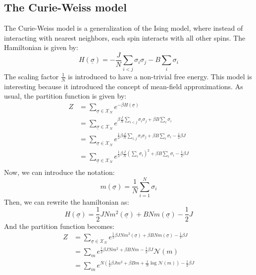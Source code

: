 \subsection{The Curie-Weiss model}
\label{sec:curie_weiss}
The Curie-Weiss model is a generalization of the Ising model, where instead of interacting with nearest neighbors, each spin interacts with all other spins. The Hamiltonian is given by:
\begin{equation}
    H(\underline{\sigma}) = -\frac{J}{N}\sum_{i<j}\sigma_i\sigma_j - B\sum_i \sigma_i
\end{equation}
The scaling factor $\frac{1}{N}$ is introduced to have a non-trivial free energy. This model is interesting because it introduced the concept of mean-field approximations. As usual, the partition function is given by:
\begin{equation}
    \begin{aligned}
        Z &= \sum_{\underline{\sigma}\in\mathcal{X}_N}e^{-\beta H(\underline{\sigma})}\\
        &= \sum_{\underline{\sigma}\in\mathcal{X}_N}e^{\beta\frac{J}{N}\sum_{i<j}\sigma_i\sigma_j+\beta B \sum_i \sigma_i}\\
        &= \sum_{\underline{\sigma}\in\mathcal{X}_N}e^{\frac{1}{2}\beta\frac{J}{N}\sum_{i,j}\sigma_i\sigma_j+\beta B \sum_i \sigma_i-\frac{1}{2}\beta J}\\
        &= \sum_{\underline{\sigma}\in\mathcal{X}_N}e^{\frac{1}{2}\beta\frac{J}{N}\left(\sum_{i}\sigma_i\right)^2+\beta B \sum_i \sigma_i-\frac{1}{2}\beta J}\\
    \end{aligned}
\end{equation}
Now, we can introduce the notation:
\begin{equation}
m(\underline{\sigma}) = \frac{1}{N}\sum_{i=1}^N \sigma_i
\end{equation}
Then, we can rewrite the hamiltonian as:
\begin{equation}
    H(\underline{\sigma}) = \frac{1}{2} J N m^2(\underline{\sigma}) + B N m(\underline{\sigma}) - \frac{1}{2} J
\end{equation}
And the partition function becomes:
\begin{equation}
    \begin{aligned}
        Z &= \sum_{\underline{\sigma}\in\mathcal{X}_N}e^{\frac{1}{2}\beta J N m^2(\underline{\sigma}) + \beta B N m(\underline{\sigma})-\frac{1}{2}\beta J}\\
        &= \sum_{m}e^{\frac{1}{2}\beta J N m^2 + \beta B N m-\frac{1}{2}\beta J}\mathcal{N}(m)\\
        &= \sum_{m}e^{N\left(\frac{1}{2}\beta J m^2 + \beta B m + \frac{1}{N}\log\mathcal{N}(m)\right)-\frac{1}{2}\beta J}
    \end{aligned}
\end{equation}
